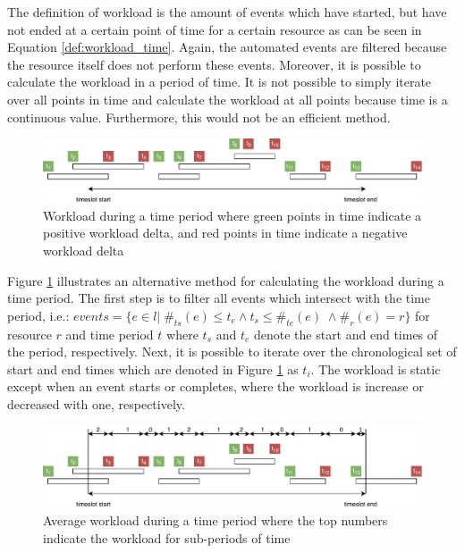 The definition of workload is the amount of events which have started, but have not ended at a certain point of time for a certain resource as can be seen in Equation \ref{def:workload_time}. Again, the automated events are filtered because the resource itself does not perform these events. Moreover, it is possible to calculate the workload in a period of time. It is not possible to simply iterate over all points in time and calculate the workload at all points because time is a continuous value. Furthermore, this would not be an efficient method.   

\begin{figure}[h]
	\centering
    \includegraphics[width=\textwidth]{figures/workload_period}
    \caption{Workload during a time period where green points in time indicate a positive workload delta, and red points in time indicate a negative workload delta}
    \label{fig:workload_period}
\end{figure}

Figure \ref{fig:workload_period} illustrates an alternative method for calculating the workload during a time period. The first step is to filter all events which intersect with the time period, i.e.: $events = \{e \in l | \; \#_{ts}(e) \leq t_e \wedge t_s \leq \#_{te}(e) \; \wedge \#_{r}(e) = r \}$ for resource $r$ and time period $t$ where $t_s$ and $t_e$ denote the start and end times of the period, respectively. Next, it is possible to iterate over the chronological set of start and end times which are denoted in Figure \ref{fig:workload_period} as $t_i$. The workload is static except when an event starts or completes, where the workload is increase or decreased with one, respectively. 

\begin{figure}[h]
	\centering
    \includegraphics[width=\textwidth]{figures/workload_period_avg}
    \caption{Average workload during a time period where the top numbers indicate the workload for sub-periods of time}
    \label{fig:workload_period_avg}
\end{figure}

